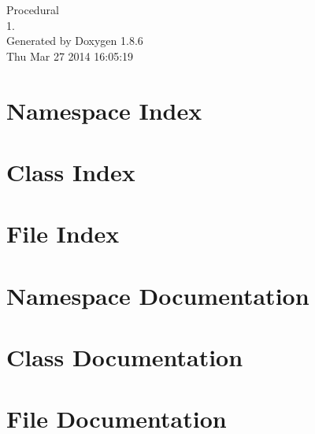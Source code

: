 \documentclass[twoside]{book}
\newcommand{\clearemptydoublepage}{%
  \newpage{\pagestyle{empty}\cleardoublepage}%
}
\begin{document}
\hypersetup{pageanchor=false}
\begin{titlepage}
\vspace*{7cm}
\begin{center}%
{\Large Procedural \\[1ex]\large 1. }\\
\vspace*{1cm}
{\large Generated by Doxygen 1.8.6}\\
\vspace*{0.5cm}
{\small Thu Mar 27 2014 16:05:19}\\
\end{center}
\end{titlepage}
\clearemptydoublepage
\tableofcontents
\clearemptydoublepage
{}
\hypersetup{pageanchor=true}

\chapter{Namespace Index}

\chapter{Class Index}

\chapter{File Index}

\chapter{Namespace Documentation}

\chapter{Class Documentation}















\chapter{File Documentation}













\newpage
{}
{}
\printindex
\end{document}
